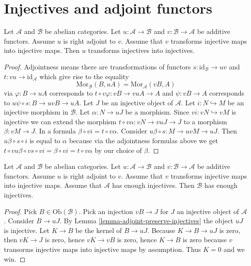\section{Injectives and adjoint functors}
\label{section-adjoint}

\begin{lemma}
\label{lemma-adjoint-preserve-injectives}
Let $\mathcal{A}$ and $\mathcal{B}$ be abelian categories.
Let $u : \mathcal{A} \to \mathcal{B}$ and
$v : \mathcal{B} \to \mathcal{A}$ be additive functors.
Assume $u$ is right adjoint to $v$.
Assume that $v$ transforms injective maps into injective maps.
Then $u$ transforms injectives into injectives.
\end{lemma}

\begin{proof}
Adjointness means there are transformations of functors
$s : \text{id}_{\mathcal{B}} \to uv$ and $t : vu \to \text{id}_{\mathcal{A}}$
which give rise to the equality
$$
\text{Mor}_{\mathcal{B}}(B, uA)
=
\text{Mor}_{\mathcal{A}}(vB, A)
$$
via $\varphi : B \to uA$ corresponds to
$t \circ v\varphi : vB \to vuA \to A$ and
$\psi : vB \to A$ corresponds to $u\psi \circ s : B \to uvB \to uA$.
Let $J$ be an injective object of $\mathcal{A}$.
Let $i : N \hookrightarrow M$ be an injective morphism
in $\mathcal{B}$. Let $\alpha : N \to uJ$ be a morphism.
Since $vi : vN \hookrightarrow vM$ is injective we can extend the morphism
$t \circ v\alpha : vN \to vuJ \to J$ to a morphism $\beta : vM \to J$.
In a formula $\beta \circ vi = t \circ v\alpha$.
Consider $u\beta \circ s : M \to uvM \to uJ$. Then
$u\beta \circ s \circ i$ is equal to $\alpha$ because
via the adjointness formulas above we get
$t \circ vu\beta \circ vs \circ vi = \beta \circ vi = t \circ v\alpha$
by our choice of $\beta$.
\end{proof}

\begin{lemma}
\label{lemma-adjoint-enough-injectives}
Let $\mathcal{A}$ and $\mathcal{B}$ be abelian categories.
Let $u : \mathcal{A} \to \mathcal{B}$ and
$v : \mathcal{B} \to \mathcal{A}$ be additive functors.
Assume $u$ is right adjoint to $v$.
Assume that $v$ transforms injective maps into injective maps.
Assume that $\mathcal{A}$ has enough injectives.
Then $\mathcal{B}$ has enough injectives.
\end{lemma}

\begin{proof}
Pick $B \in \text{Ob}(\mathcal{B})$.
Pick an injection $vB \to J$ for $J$
an injective object of $\mathcal{A}$.
Consider $B \to uJ$. By Lemma \ref{lemma-adjoint-preserve-injectives}
the object $uJ$ is injective. Let $K \to B$ be the
kernel of $B \to uJ$. Because
$K \to B \to uJ$ is zero, then
$vK \to J$ is zero, hence $vK \to vB$ is zero,
hence $K \to B$ is zero because $v$
transorms injective maps into injective maps
by assumption. Thus $K = 0$ and we win.
\end{proof}

